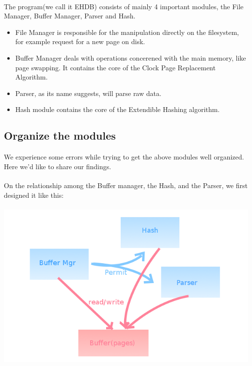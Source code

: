 \documentclass{article}
\begin{document}
        \paragraph{}
            The program(we call it EHDB) consists of mainly 4 important modules, the File Manager, Buffer Manager, Parser and Hash.
        \begin{itemize}
            \item File Manager is responsible for the manipulation directly on the filesystem, for example request for a new page on disk.
            \item Buffer Manager deals with operations concerened with the main memory, like page swapping. It contains the core of the Clock Page Replacement Algorithm.
            \item Parser, as its name suggests, will parse raw data.
            \item Hash module contains the core of the Extendible Hashing algorithm.
        \end{itemize}
    \subsection{Organize the modules}
        \paragraph{}
            We experience some errors while trying to get the above modules well organized. Here we'd like to share our findings.
        \paragraph{}
            On the relationship among the Buffer manager, the Hash, and the Parser, we first designed it like this:
        \paragraph{} \includegraphics[scale=0.5]{img/arch1.png}
\end{document}
